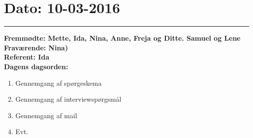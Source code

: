 \section{Dato: 10-03-2016}
\hrule
\textbf{Fremmødte: Mette, Ida, Nina, Anne, Freja og Ditte. Samuel og Lene} \\
\textbf{Fraværende: Nina)} \\
\textbf{Referent: Ida } \\
\textbf{Dagens dagsorden: }
\begin{enumerate}
	\item Gennemgang af spørgeskema
	\item Gennemgang af interviewspørgsmål
	\item Gennemgang af mail
	\item Evt. 
\end{enumerate}

